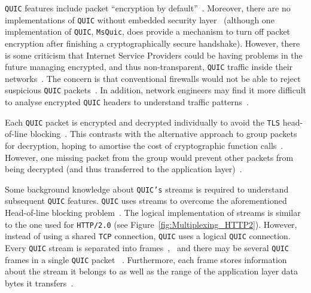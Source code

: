 \documentclass[12pt,a4paper]{report}
\begin{document}
 
 \texttt{QUIC} features include packet \enquote{encryption by default}~\cite{the-road-to-quic}.
  Moreover, there are no implementations of \texttt{QUIC} without embedded security layer~\cite{head-of-line-blocking-in-quic-and-http-3-the-details}
  (although one implementation of \texttt{QUIC}, \texttt{MsQuic}, does provide a mechanism to turn off packet encryption after finishing a cryptographically secure handshake).
  However, there is some criticism that Internet Service Providers could be having problems in the future managing encrypted, and thus non-transparent, \texttt{QUIC} traffic inside their networks~\cite{why-is-googles-quic-leaving-network-operators-in-the-dark}.
  The concern is that conventional firewalls would not be able to reject suspicious \texttt{QUIC} packets~\cite{quic-the-internet-transport-protocol-based-on-udp}.
  In addition, network engineers may find it more difficult to analyse encrypted \texttt{QUIC} headers to understand traffic patterns~\cite{2017-12-18-transport-header-encryption}.
  
  Each \texttt{QUIC} packet is encrypted and decrypted individually to avoid the \texttt{TLS} head-of-line blocking~\cite{head-of-line-blocking-in-quic-and-http-3-the-details}.
  This contrasts with the alternative approach to group packets for decryption, hoping to amortise the cost of cryptographic function calls~\cite{head-of-line-blocking-in-quic-and-http-3-the-details, optimizing-tls-record-size-and-buffering-latency}.
  However, one missing packet from the group would prevent other packets from being decrypted (and thus transferred to the application layer)~\cite{head-of-line-blocking-in-quic-and-http-3-the-details}.


  
  Some background knowledge about \texttt{QUIC's} streams is required to understand subsequent \texttt{QUIC} features.
  \texttt{QUIC} uses streams to overcome the aforementioned Head-of-line blocking problem~\cite{UnderstandQUIC}.
  The logical implementation of streams is similar to the one used for \texttt{HTTP/2.0} (see Figure~\ref{fig:Multiplexing_HTTP2}).
  However, instead of using a shared \texttt{TCP} connection, \texttt{QUIC} uses a logical \texttt{QUIC} connection.
  Every \texttt{QUIC} stream is separated into frames~\cite{UnderstandQUIC},~\cite[Chapter~2.1]{ ietf-quic-transport-draft-32} and there may be several \texttt{QUIC} frames in a single \texttt{QUIC} packet ~\cite[Chapter~1]{ ietf-quic-transport-draft-32}.
  Furthermore, each frame stores information about the stream it belongs to as well as the range of the application layer data bytes it transfers~\cite{UnderstandQUIC}.
\end{document}
